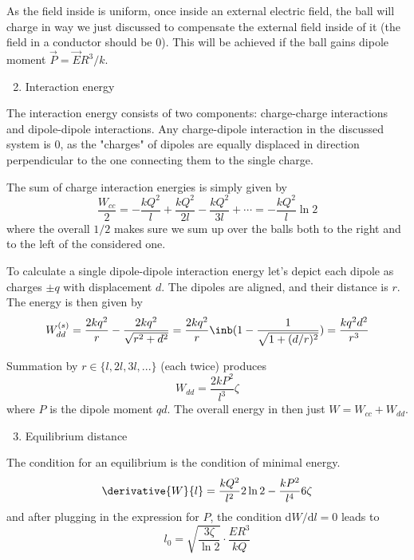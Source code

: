 As the field inside is uniform,
once inside an external electric field,
the ball will charge in way we just discussed
to compensate the external field inside of it
(the field in a conductor should be $0$).
This will be achieved if the ball gains dipole moment
$\vec{P} = \vec{E} R^3 / k$.

\begin{enumerate}
    \setcounter{enumi}{1}
    \item Interaction energy
\end{enumerate}

The interaction energy consists of two components:
charge-charge interactions and dipole-dipole interactions.
Any charge-dipole interaction in the discussed system is $0$,
as the "charges" of dipoles are equally displaced in direction
perpendicular to the one connecting them to the single charge.

The sum of charge interaction energies is simply given by
\begin{equation}
    \frac{W_{cc}}{2} = -\frac{kQ^2}{l} + \frac{kQ^2}{2l} - \frac{kQ^2}{3l} + \cdots =
    -\frac{kQ^2}{l} \ln{2}
\end{equation}
where the overall $1/2$ makes sure we sum up over the balls
both to the right and to the left of the considered one.

To calculate a single dipole-dipole interaction energy
let's depict each dipole as charges $\pm q$ with displacement $d$.
The dipoles are aligned, and their distance is $r$.
The energy is then given by
\begin{equation}
    W^{(s)}_{dd} = \frac{2kq^2}{r} - \frac{2kq^2}{\sqrt{r^2 + d^2}} =
    \frac{2 k q^2}{r} \inb({1 - \frac{1}{\sqrt{1+(d/r)^2}}}) =
    \frac{k q^2 d^2}{r^3}
\end{equation}

Summation by $r \in \{l, 2l, 3l, ...\}$ (each twice) produces
\begin{equation}
    W_{dd} = \frac{2 k P^2}{l^3} \zeta
\end{equation}
where $P$ is the dipole moment $qd$.
The overall energy in then just $W = W_{cc} + W_{dd}$.

\begin{enumerate}
    \setcounter{enumi}{2}
    \item Equilibrium distance
\end{enumerate}

The condition for an equilibrium is the condition of minimal energy.
\begin{equation}
    \derivative{W}{l} = \frac{k Q^2}{l^2} 2\ln{2} - \frac{k P^2}{l^4} 6\zeta
\end{equation}
and after plugging in the expression for $P$,
the condition $\text{d}W/\text{d}l = 0$ leads to
\begin{equation}
    l_0 = \sqrt{\frac{3\zeta}{\ln{2}}} \cdot \frac{E R^3}{k Q}
\end{equation}

